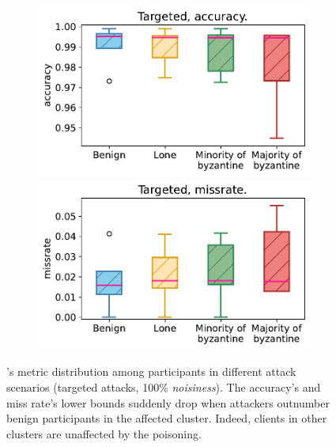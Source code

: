 \begin{figure}[!t]
  \begin{subfigure}[t]{1.0\linewidth}
    \centering 
    \includegraphics[width=0.47\linewidth]{figures/poisoning/trusfids_targeted_acc_all_distibutions.pdf}    
    \includegraphics[width=0.47\linewidth]{figures/poisoning/trusfids_targeted_missrate_all_distibutions.pdf}   
\end{subfigure}
  \caption{
    \thecontrib's metric distribution among participants in different attack scenarios (targeted attacks, 100\% \emph{noisiness}).
    The accuracy's and miss rate's lower bounds suddenly drop when attackers outnumber benign participants in the affected cluster.
    Indeed, clients in other clusters are unaffected by the poisoning.
  }
  \label{fig:trustfids_accuracy_missrate_distribution}
  
\end{figure}